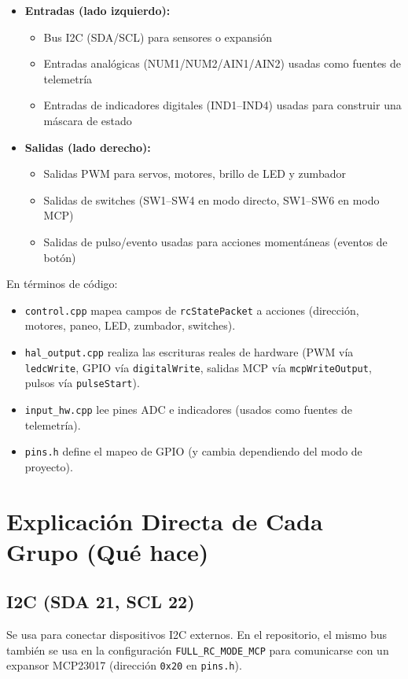 \begin{itemize}
    \item \textbf{Entradas (lado izquierdo):}
    \begin{itemize}
        \item Bus I2C (SDA/SCL) para sensores o expansión
        \item Entradas analógicas (NUM1/NUM2/AIN1/AIN2) usadas como fuentes de telemetría
        \item Entradas de indicadores digitales (IND1--IND4) usadas para construir una máscara de estado
    \end{itemize}
    \item \textbf{Salidas (lado derecho):}
    \begin{itemize}
        \item Salidas PWM para servos, motores, brillo de LED y zumbador
        \item Salidas de switches (SW1--SW4 en modo directo, SW1--SW6 en modo MCP)
        \item Salidas de pulso/evento usadas para acciones momentáneas (eventos de botón)
    \end{itemize}
\end{itemize}

\noindent En términos de código:
\begin{itemize}
    \item \texttt{control.cpp} mapea campos de \texttt{rcStatePacket} a acciones (dirección, motores, paneo, LED, zumbador, switches).
    \item \texttt{hal\_output.cpp} realiza las escrituras reales de hardware (PWM vía \texttt{ledcWrite}, GPIO vía \texttt{digitalWrite},
    salidas MCP vía \texttt{mcpWriteOutput}, pulsos vía \texttt{pulseStart}).
    \item \texttt{input\_hw.cpp} lee pines ADC e indicadores (usados como fuentes de telemetría).
    \item \texttt{pins.h} define el mapeo de GPIO (y cambia dependiendo del modo de proyecto).
\end{itemize}

\section{Explicación Directa de Cada Grupo (Qué hace)}
\label{sec:wiring-components}

\subsection{I2C (SDA 21, SCL 22)}
Se usa para conectar dispositivos I2C externos. En el repositorio, el mismo bus también se usa en la configuración
\texttt{FULL\_RC\_MODE\_MCP} para comunicarse con un expansor MCP23017 (dirección \texttt{0x20} en \texttt{pins.h}).

